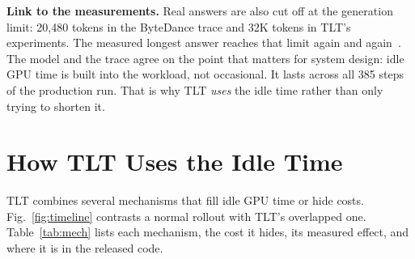 \documentclass[conference]{IEEEtran}
\begin{document}
\textbf{Link to the measurements.} Real answers are also cut off at the generation limit: 20,480 tokens in the ByteDance trace and 32K tokens in TLT's experiments. The measured longest answer reaches that limit again and again~\cite[Fig.~2]{hu2026tlt}. The model and the trace agree on the point that matters for system design: idle GPU time is built into the workload, not occasional. It lasts across all 385 steps of the production run. That is why TLT \emph{uses} the idle time rather than only trying to shorten it.

\section{How TLT Uses the Idle Time}
\label{sec:design}

TLT combines several mechanisms that fill idle GPU time or hide costs. Fig.~\ref{fig:timeline} contrasts a normal rollout with TLT's overlapped one. Table~\ref{tab:mech} lists each mechanism, the cost it hides, its measured effect, and where it is in the released code.
\end{document}

